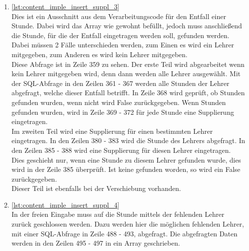 \begin{enumerate}
\item \autoref{lst:content_imple_insert_suppl_3}\\
Dies ist ein Ausschnitt aus dem Verarbeitungscode für den Entfall einer Stunde. Dabei wird das Array wie gewohnt befüllt, jedoch muss anschließend die Stunde, für die der Entfall eingetragen werden soll, gefunden werden. Dabei müssen 2 Fälle unterschieden werden, zum Einen es wird ein Lehrer mitgegeben, zum Anderen es wird kein Lehrer mitgegeben.\\
Diese Abfrage ist in Zeile 359 zu sehen. Der erste Teil wird abgearbeitet wenn kein Lehrer mitgegeben wird, denn dann werden alle Lehrer ausgewählt. Mit der SQL-Abfrage in den Zeilen 361 - 367 werden alle Stunden der Lehrer abgefragt, welche dieser Entfall betrifft. In Zeile 368 wird geprüft, ob Stunden gefunden wurden, wenn nicht wird False zurückgegeben. Wenn Stunden gefunden wurden, wird in Zeile 369 - 372 für jede Stunde eine Supplierung eingetragen.\\
Im zweiten Teil wird eine Supplierung für einen bestimmten Lehrer eingetragen. In den Zeilen 380 - 383 wird die Stunde des Lehrers abgefragt. In den Zeilen 385 - 388 wird eine Supplierung für diesen Lehrer eingetragen. Dies geschieht nur, wenn eine Stunde zu diesem Lehrer gefunden wurde, dies wird in der Zeile 385 überprüft. Ist keine gefunden worden, so wird ein False zurückgegeben.\\
Dieser Teil ist ebenfalls bei der Verschiebung vorhanden.

\newpage


\item \autoref{lst:content_imple_insert_suppl_4}\\
In der freien Eingabe muss auf die Stunde mittels der fehlenden Lehrer zurück geschlossen werden. Dazu werden hier die möglichen fehlenden Lehrer, mit einer SQL-Abfrage in Zeile 488 - 493, abgefragt. Die abgefragten Daten werden in den Zeilen 495 - 497 in ein Array geschrieben.




\end{enumerate}
